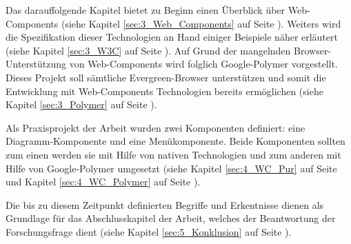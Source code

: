 Das darauffolgende Kapitel bietet zu Beginn einen Überblick über Web-Components (siehe Kapitel \ref{sec:3_Web_Components} auf Seite \pageref{sec:3_Web_Components}). Weiters wird die Spezifikation dieser Technologien an Hand einiger Beispiele näher erläutert (siehe Kapitel \ref{sec:3_W3C} auf Seite \pageref{sec:3_W3C}). Auf Grund der mangelnden Browser-Unterstützung von Web-Components wird folglich Google-Polymer vorgestellt. Dieses Projekt soll sämtliche \glqq Evergreen\grqq -Browser unterstützen und somit die Entwicklung mit Web-Components Technologien bereits ermöglichen (siehe Kapitel \ref{sec:3_Polymer} auf Seite \pageref{sec:3_Polymer}).

Als Praxisprojekt der Arbeit wurden zwei Komponenten definiert: eine Diagramm-Komponente und eine Menükomponente. Beide Komponenten sollten zum einen werden sie mit Hilfe von nativen Technologien und zum anderen mit Hilfe von Google-Polymer umgesetzt (siehe Kapitel \ref{sec:4_WC_Pur} auf Seite \pageref{sec:4_WC_Pur} und Kapitel \ref{sec:4_WC_Polymer} auf Seite \pageref{sec:4_WC_Polymer}).

Die bis zu diesem Zeitpunkt definierten Begriffe und Erkentnisse dienen als Grundlage für das Abschlusskapitel der Arbeit, welches der Beantwortung der Forschungsfrage dient (siehe Kapitel \ref{sec:5_Konklusion} auf Seite \pageref{sec:5_Konklusion}).